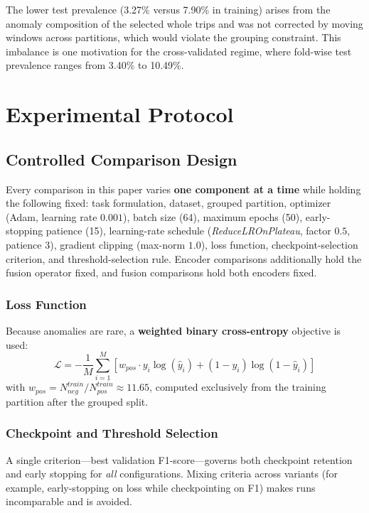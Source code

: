 \documentclass[journal]{IEEEtran}
\begin{document}
The lower test prevalence (3.27\% versus 7.90\% in training) arises from the anomaly composition of the selected whole trips and was not corrected by moving windows across partitions, which would violate the grouping constraint. This imbalance is one motivation for the cross-validated regime, where fold-wise test prevalence ranges from 3.40\% to 10.49\%.

\section{Experimental Protocol}
\label{sec:protocol}

\subsection{Controlled Comparison Design}
Every comparison in this paper varies \textbf{one component at a time} while holding the following fixed: task formulation, dataset, grouped partition, optimizer (Adam, learning rate $0.001$), batch size (64), maximum epochs (50), early-stopping patience (15), learning-rate schedule (\textit{ReduceLROnPlateau}, factor $0.5$, patience 3), gradient clipping (max-norm $1.0$), loss function, checkpoint-selection criterion, and threshold-selection rule. Encoder comparisons additionally hold the fusion operator fixed, and fusion comparisons hold both encoders fixed.

\subsubsection{Loss Function}
Because anomalies are rare, a \textbf{weighted binary cross-entropy} objective is used:
\begin{equation}
  \label{eq:wbce}
  \mathcal{L} = -\frac{1}{M} \sum_{i=1}^{M} [w_{pos} \cdot y_i \log(\hat{y}_i) + (1 - y_i) \log(1 - \hat{y}_i)]
\end{equation}
with $w_{pos}=N_{neg}^{train}/N_{pos}^{train}\approx11.65$, computed exclusively from the training partition after the grouped split.

\subsubsection{Checkpoint and Threshold Selection}
A single criterion---best validation F1-score---governs both checkpoint retention and early stopping for \emph{all} configurations. Mixing criteria across variants (for example, early-stopping on loss while checkpointing on F1) makes runs incomparable and is avoided.
\end{document}
